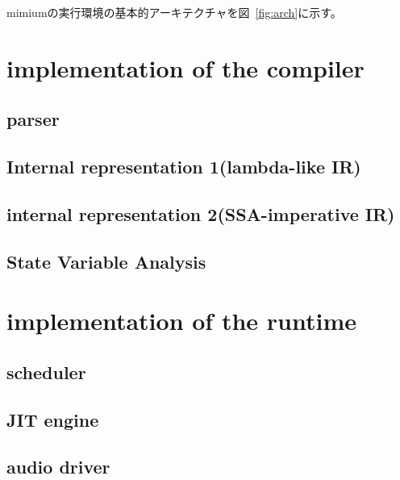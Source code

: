 mimiumの実行環境の基本的アーキテクチャを図~\ref{fig:arch}に示す。

\hypertarget{implementation-of-the-compiler}{%
\section{implementation of the
compiler}\label{implementation-of-the-compiler}}

\hypertarget{parser}{%
\subsection{parser}\label{parser}}

\hypertarget{internal-representation-1lambda-like-ir}{%
\subsection{Internal representation 1(lambda-like
IR)}\label{internal-representation-1lambda-like-ir}}

\hypertarget{internal-representation-2ssa-imperative-ir}{%
\subsection{internal representation 2(SSA-imperative
IR)}\label{internal-representation-2ssa-imperative-ir}}

\hypertarget{state-variable-analysis}{%
\subsection{State Variable Analysis}\label{state-variable-analysis}}

\hypertarget{implementation-of-the-runtime}{%
\section{implementation of the
runtime}\label{implementation-of-the-runtime}}

\hypertarget{scheduler}{%
\subsection{scheduler}\label{scheduler}}

\hypertarget{jit-engine}{%
\subsection{JIT engine}\label{jit-engine}}

\hypertarget{audio-driver}{%
\subsection{audio driver}\label{audio-driver}}

